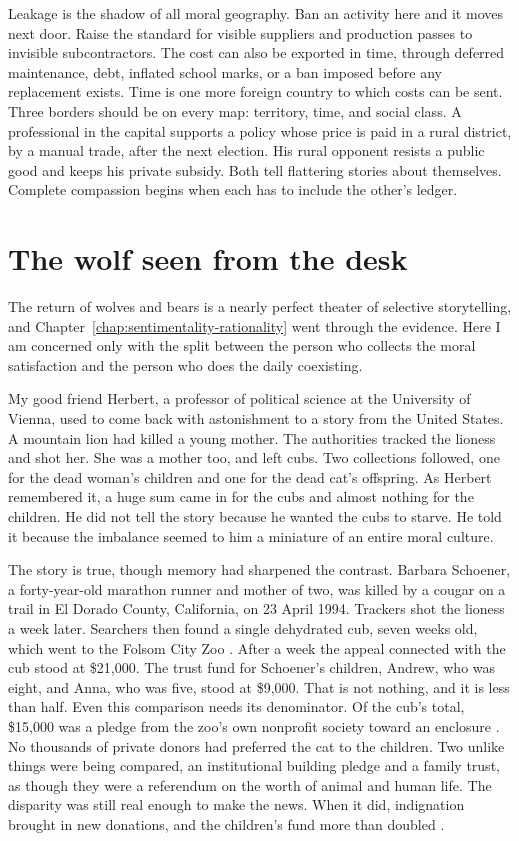 \documentclass[12pt,a4paper]{book}
\begin{document}
Leakage is the shadow of all moral geography. Ban an activity here and it moves next door. Raise the standard for visible suppliers and production passes to invisible subcontractors. The cost can also be exported in time, through deferred maintenance, debt, inflated school marks, or a ban imposed before any replacement exists. Time is one more foreign country to which costs can be sent. Three borders should be on every map: territory, time, and social class. A professional in the capital supports a policy whose price is paid in a rural district, by a manual trade, after the next election. His rural opponent resists a public good and keeps his private subsidy. Both tell flattering stories about themselves. Complete compassion begins when each has to include the other's ledger.

\section{The wolf seen from the desk}

The return of wolves and bears is a nearly perfect theater of selective storytelling, and Chapter~\ref{chap:sentimentality-rationality} went through the evidence. Here I am concerned only with the split between the person who collects the moral satisfaction and the person who does the daily coexisting.

My good friend Herbert, a professor of political science at the University of Vienna, used to come back with astonishment to a story from the United States. A mountain lion had killed a young mother. The authorities tracked the lioness and shot her. She was a mother too, and left cubs. Two collections followed, one for the dead woman's children and one for the dead cat's offspring. As Herbert remembered it, a huge sum came in for the cubs and almost nothing for the children. He did not tell the story because he wanted the cubs to starve. He told it because the imbalance seemed to him a miniature of an entire moral culture.

The story is true, though memory had sharpened the contrast. Barbara Schoener, a forty-year-old marathon runner and mother of two, was killed by a cougar on a trail in El Dorado County, California, on 23 April 1994. Trackers shot the lioness a week later. Searchers then found a single dehydrated cub, seven weeks old, which went to the Folsom City Zoo \cite{LATimesSchoenerCubs1994,DeseretSchoenerCub1994}. After a week the appeal connected with the cub stood at \$21,000. The trust fund for Schoener's children, Andrew, who was eight, and Anna, who was five, stood at \$9,000. That is not nothing, and it is less than half. Even this comparison needs its denominator. Of the cub's total, \$15,000 was a pledge from the zoo's own nonprofit society toward an enclosure \cite{ChicagoTribuneSchoenerFunds1994}. No thousands of private donors had preferred the cat to the children. Two unlike things were being compared, an institutional building pledge and a family trust, as though they were a referendum on the worth of animal and human life. The disparity was still real enough to make the news. When it did, indignation brought in new donations, and the children's fund more than doubled \cite{NYTimesSchoenerFunds1994,WashingtonPostSchoenerFunds1994}.
\end{document}
